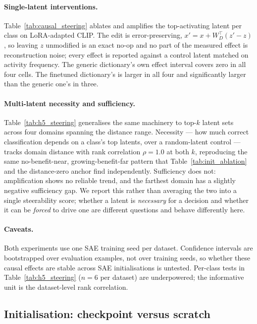 \paragraph{Single-latent interventions.}
Table~\ref{tab:causal_steering} ablates and amplifies the top-activating latent per
class on LoRA-adapted CLIP. The edit is error-preserving, $x' = x + W_D^{\top}(z' - z)$,
so leaving $z$ unmodified is an exact no-op and no part of the measured effect is
reconstruction noise; every effect is reported against a control latent matched on
activity frequency. The generic dictionary's own effect interval covers zero in all four
cells. The finetuned dictionary's is larger in all four and significantly larger than the
generic one's in three.

\paragraph{Multi-latent necessity and sufficiency.}
Table~\ref{tab:h5_steering} generalises the same machinery to top-$k$ latent sets across
four domains spanning the distance range. Necessity --- how much correct classification
depends on a class's top latents, over a random-latent control --- tracks domain distance
with rank correlation $\rho = 1.0$ at both $k$, reproducing the same
no-benefit-near, growing-benefit-far pattern that Table~\ref{tab:init_ablation} and the
distance-zero anchor find independently. Sufficiency does not: amplification shows no
reliable trend, and the farthest domain has a slightly negative sufficiency gap. We
report this rather than averaging the two into a single steerability score; whether a
latent is \emph{necessary} for a decision and whether it can be \emph{forced} to drive one
are different questions and behave differently here.

\paragraph{Caveats.} Both experiments use one SAE training seed per dataset. Confidence
intervals are bootstrapped over evaluation examples, not over training seeds, so whether
these causal effects are stable across SAE initialisations is untested. Per-class tests
in Table~\ref{tab:h5_steering} ($n=6$ per dataset) are underpowered; the informative unit
is the dataset-level rank correlation.





\subsection{Initialisation: checkpoint versus scratch}
\label{app:init}

